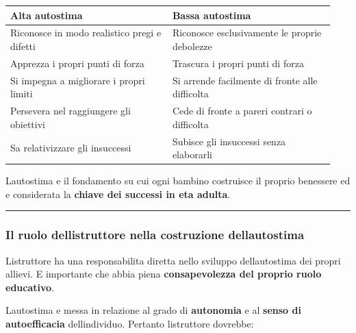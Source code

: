 \documentclass[a4paper,11pt]{article}
\begin{document}
\begin{longtable}[]{@{}p{0.47\linewidth}p{0.47\linewidth}@{}}
      \toprule\noalign{}
      Alta autostima                               & Bassa autostima                  \\
      \midrule\noalign{}
      \endhead
      \bottomrule\noalign{}
      \endlastfoot
      Riconosce in modo realistico pregi e difetti & Riconosce esclusivamente
      le proprie debolezze                                                            \\
      Apprezza i propri punti di forza             & Trascura i propri punti di forza \\
      Si impegna a migliorare i propri limiti      & Si arrende facilmente di
      fronte alle difficolta                                                          \\
      Persevera nel raggiungere gli obiettivi      & Cede di fronte a pareri
      contrari o difficolta                                                           \\
      Sa relativizzare gli insuccessi              & Subisce gli insuccessi senza
      elaborarli                                                                      \\
\end{longtable}

L\textquotesingle autostima e il fondamento su cui ogni bambino
costruisce il proprio benessere ed e considerata la \textbf{chiave dei
      successi in eta adulta}.

\begin{center}\rule{0.5\linewidth}{0.5pt}\end{center}

\subsubsection{Il ruolo dell\textquotesingle istruttore nella
      costruzione
      dell\textquotesingle autostima}\label{il-ruolo-dellistruttore-nella-costruzione-dellautostima}

L\textquotesingle istruttore ha una responsabilita diretta nello
sviluppo dell\textquotesingle autostima dei propri allievi. E importante
che abbia piena \textbf{consapevolezza del proprio ruolo educativo}.

L\textquotesingle autostima e messa in relazione al grado di
\textbf{autonomia} e al \textbf{senso di autoefficacia}
dell\textquotesingle individuo. Pertanto l\textquotesingle istruttore
dovrebbe:
\end{document}
